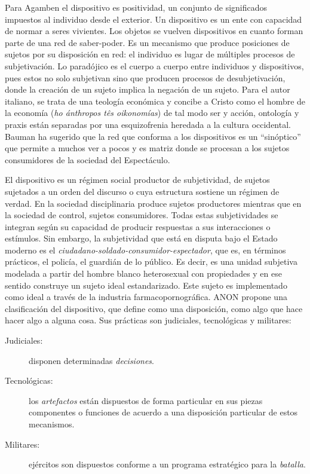 Para Agamben el dispositivo es positividad, un conjunto de significados impuestos al individuo desde el exterior. Un dispositivo es un ente con capacidad de normar a seres vivientes. Los objetos se vuelven dispositivos en cuanto forman parte de una red de saber-poder. Es un mecanismo que produce posiciones de sujetos por su disposición en red: el individuo es lugar de múltiples procesos de subjetivación. Lo paradójico es el cuerpo a cuerpo entre individuos y dispositivos, pues estos no solo subjetivan sino que producen procesos de desubjetivación, donde la creación de un sujeto implica la negación de un sujeto. Para el autor italiano, se trata de una teología económica y concibe a Cristo como el hombre de la economía (\emph{ho ánthropos tês oikonomías}) de tal modo ser y acción, ontología y praxis están separadas por una esquizofrenia heredada a la cultura occidental. Bauman ha sugerido que la red que conforma a los dispositivos es un \enquote{sinóptico} que permite a muchos ver a pocos y es matriz donde se procesan a los sujetos consumidores de la sociedad del Espectáculo.

El dispositivo es un régimen social productor de subjetividad, de sujetos sujetados a un orden del discurso o cuya estructura sostiene un régimen de verdad. En la sociedad disciplinaria produce sujetos productores mientras que en la sociedad de control, sujetos consumidores. Todas estas subjetividades se integran según su capacidad de producir respuestas a sus interacciones o estímulos. Sin embargo, la subjetividad que está en disputa bajo el Estado moderno es el \emph{ciudadano-soldado-consumidor-espectador}, que es, en términos prácticos, el policía, el guardián de lo público. Es decir, es una unidad subjetiva modelada a partir del hombre blanco heterosexual con propiedades y en ese sentido construye un sujeto ideal estandarizado. Este sujeto es implementado como ideal a través de la industria farmacopornográfica. ANON propone una clasificación del dispositivo, que define como una disposición, como algo que hace hacer algo a alguna cosa. Sus prácticas son judiciales, tecnológicas y militares:

\begin{description}
  \item[Judiciales:] disponen determinadas \emph{decisiones}.
  \item[Tecnológicas:] los \emph{artefactos} están dispuestos de forma particular en sus piezas componentes o funciones de acuerdo a una disposición particular de estos mecanismos.
  \item[Militares:] ejércitos son dispuestos conforme a un programa estratégico para la \emph{batalla}.
\end{description}

